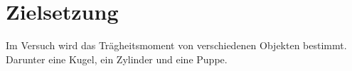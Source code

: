 
\section{Zielsetzung}
\label{sec:Zielsetzung}

Im Versuch wird das Trägheitsmoment von verschiedenen Objekten bestimmt. Darunter eine Kugel, ein Zylinder und eine Puppe.